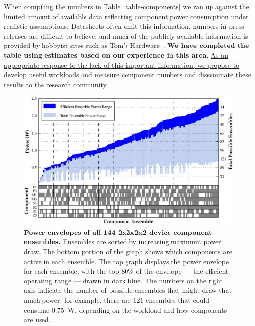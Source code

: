 When compiling the numbers in Table~\ref{table-components} we ran up against
the limited amount of available data reflecting component power consumption
under realistic assumptions. Datasheets often omit this information, numbers
in press releases are difficult to believe, and much of the
publicly-available information is provided by hobbyist sites such as Tom's
Hardware~\cite{tomshardware-www}. \textbf{We have completed the table using
estimates based on our experience in this area.} \uline{As an appropriate
response to the lack of this important information, we propose to develop
useful workloads and measure component numbers and disseminate these results
to the research community.}

\begin{figure}[t]
\centering
\includegraphics{./figures/componentgraph.pdf}

\caption{\textbf{Power envelopes of all 144 2x2x2x2 device component
ensembles.} Ensembles are sorted by increasing maximum power draw. The bottom
portion of the graph shows which components are active in each ensemble. The
top graph displays the power envelope for each ensemble, with the top 80\% of
the envelope --- the efficient operating range --- drawn in dark blue. The
numbers on the right axis indicate the number of possible ensembles that
might draw that much power: for example, there are 121 ensembles that could
consume 0.75~W, depending on the workload and how components are used.}
\vspace{-0.05in}
\label{figure-componentgraph}
\end{figure}

